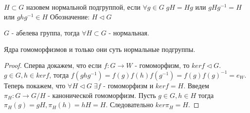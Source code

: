\begin{defn}
  $H \subset G$ назовем нормальной подгруппой, если $ \forall g \in G \; gH = Hg $ или $ gHg^{-1} = H $ или $ ghg^{-1} \in H $  
  \newline Обозначение: $H \triangleleft G$
\end{defn}

\begin{thm}
  $ G $ - абелева группа, тогда $ \forall H \subset G $ - нормальная.
\end{thm}

\pagebreak

\begin{thm}
  Ядра гомоморфизмов и только они суть нормальные подгруппы.
\end{thm}
\begin{proof}
  Сперва докажем, что если $ f: G \rightarrow W $ - гомоморфизм, то $ ker f \triangleleft G $. 
  $ g \in G, h \in ker f $, тогда $ f(ghg^{-1}) = f(g)f(h)f(g^{-1}) = f(g)f(g)^{-1} = e_W $. \newline
  Теперь покажем, что $ \forall H \triangleleft G \; \exists f $ - гомоморфизм и $ ker f = H $.
  Введем $ \pi_{H} : G \rightarrow G/H $ - канонической гомоморфизм. Пусть $ g \in G, h \in H $ 
  тогда $\pi_{H}(g) = gH, \pi_{H}(h) = hH = H $. Следовательно $ ker \pi_{H} = H $.
\end{proof}





